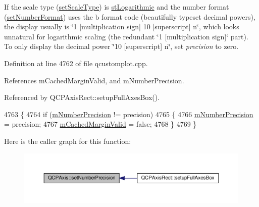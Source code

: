 If the scale type (\hyperlink{class_q_c_p_axis_adef29cae617af4f519f6c40d1a866ca6}{set\+Scale\+Type}) is \hyperlink{class_q_c_p_axis_a36d8e8658dbaa179bf2aeb973db2d6f0abf5b785ad976618816dc6f79b73216d4}{st\+Logarithmic} and the number format (\hyperlink{class_q_c_p_axis_ae585a54dc2aac662e90a2ca82f002590}{set\+Number\+Format}) uses the \textquotesingle{}b\textquotesingle{} format code (beautifully typeset decimal powers), the display usually is \char`\"{}1 \mbox{[}multiplication sign\mbox{]} 10 \mbox{[}superscript\mbox{]} n\char`\"{}, which looks unnatural for logarithmic scaling (the redundant \char`\"{}1 \mbox{[}multiplication sign\mbox{]}\char`\"{} part). To only display the decimal power \char`\"{}10
\mbox{[}superscript\mbox{]} n\char`\"{}, set {\itshape precision} to zero. 

Definition at line 4762 of file qcustomplot.\+cpp.



References m\+Cached\+Margin\+Valid, and m\+Number\+Precision.



Referenced by Q\+C\+P\+Axis\+Rect\+::setup\+Full\+Axes\+Box().


\begin{DoxyCode}
4763 \{
4764   \textcolor{keywordflow}{if} (\hyperlink{class_q_c_p_axis_acd76e8c783384d99ccc4a13797eec188}{mNumberPrecision} != precision)
4765   \{
4766     \hyperlink{class_q_c_p_axis_acd76e8c783384d99ccc4a13797eec188}{mNumberPrecision} = precision;
4767     \hyperlink{class_q_c_p_axis_a2cde37b6e385f47e11322df4ac1b0e9b}{mCachedMarginValid} = \textcolor{keyword}{false};
4768   \}
4769 \}
\end{DoxyCode}


Here is the caller graph for this function\+:\nopagebreak
\begin{figure}[H]
\begin{center}
\leavevmode
\includegraphics[width=350pt]{class_q_c_p_axis_a21dc8023ad7500382ad9574b48137e63_icgraph}
\end{center}
\end{figure}


\hypertarget{class_q_c_p_axis_a04a652603cbe50eba9969ee6d68873c3}{}
